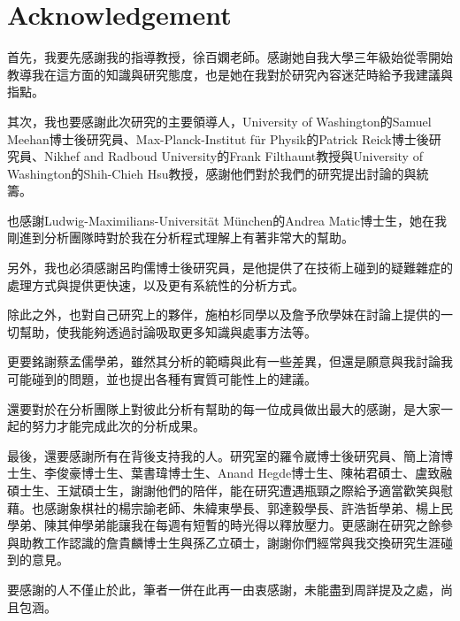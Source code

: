 \documentclass[class=NCU_thesis, crop=false]{standalone}
\begin{document}
\chapter{Acknowledgement}

首先，我要先感謝我的指導教授，徐百嫻老師。感謝她自我大學三年級始從零開始教導我在這方面的知識與研究態度，也是她在我對於研究內容迷茫時給予我建議與指點。

其次，我也要感謝此次研究的主要領導人，University of Washington的Samuel Meehan博士後研究員、Max-Planck-Institut f\"{u}r Physik的Patrick Reick博士後研究員、Nikhef and Radboud University的Frank Filthaunt教授與University of Washington的Shih-Chieh Hsu教授，感謝他們對於我們的研究提出討論的與統籌。

也感謝Ludwig-Maximilians-Universit\"{a}t M\"{u}nchen的Andrea Matic博士生，她在我剛進到分析團隊時對於我在分析程式理解上有著非常大的幫助。

另外，我也必須感謝呂昀儒博士後研究員，是他提供了在技術上碰到的疑難雜症的處理方式與提供更快速，以及更有系統性的分析方式。

除此之外，也對自己研究上的夥伴，施柏杉同學以及詹予欣學妹在討論上提供的一切幫助，使我能夠透過討論吸取更多知識與處事方法等。

更要銘謝蔡孟儒學弟，雖然其分析的範疇與此有一些差異，但還是願意與我討論我可能碰到的問題，並也提出各種有實質可能性上的建議。

還要對於在分析團隊上對彼此分析有幫助的每一位成員做出最大的感謝，是大家一起的努力才能完成此次的分析成果。

最後，還要感謝所有在背後支持我的人。研究室的羅令崴博士後研究員、簡上淯博士生、李俊豪博士生、葉書瑋博士生、Anand Hegde博士生、陳祐君碩士、盧致融碩士生、王斌碩士生，謝謝他們的陪伴，能在研究遭遇瓶頸之際給予適當歡笑與慰藉。也感謝象棋社的楊宗諭老師、朱緯東學長、郭達毅學長、許浩哲學弟、楊上民學弟、陳其伸學弟能讓我在每週有短暫的時光得以釋放壓力。更感謝在研究之餘參與助教工作認識的詹貴麟博士生與孫乙立碩士，謝謝你們經常與我交換研究生涯碰到的意見。

要感謝的人不僅止於此，筆者一併在此再一由衷感謝，未能盡到周詳提及之處，尚且包涵。
\end{document}
